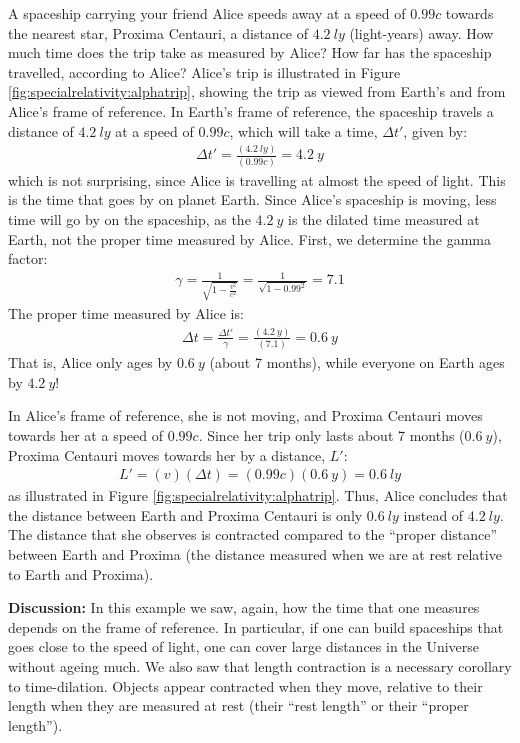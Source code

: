 \vspace{-0.3cm}
\begin{example}{\label{ex:specialrelativity:alphatrip}A spaceship carrying your friend Alice speeds away at a speed of $0.99c$ towards the nearest star, Proxima Centauri, a distance of $\SI{4.2}{ly}$ (light-years) away. How much time does the trip take as measured by Alice? How far has the spaceship travelled, according to Alice?}
Alice's trip is illustrated in Figure \ref{fig:specialrelativity:alphatrip}, showing the trip as viewed from Earth's and from Alice's frame of reference.
In Earth's frame of reference, the spaceship travels a distance of $\SI{4.2}{ly}$ at a speed of $0.99c$, which will take a time, $\Delta t'$, given by:
\begin{align*}
\Delta t' = \frac{(\SI{4.2}{ly})}{(0.99c)}=\SI{4.2}{y}
\end{align*}
which is not surprising, since Alice is travelling at almost the speed of light. This is the time that goes by on planet Earth. Since Alice's spaceship is moving, less time will go by on the spaceship, as the $\SI{4.2}{y}$ is the dilated time measured at Earth, not the proper time measured by Alice. First, we determine the gamma factor:
\begin{align*}
\gamma = \frac{1}{\sqrt{1-\frac{v^2}{c^2}}} =\frac{1}{\sqrt{1-0.99^2}}=7.1
\end{align*}
The proper time measured by Alice is:
\begin{align*}
\Delta t = \frac{\Delta t'}{\gamma}=\frac{(\SI{4.2}{y})}{(7.1)}=\SI{0.6}{y}
\end{align*}
That is, Alice only ages by $\SI{0.6}{y}$ (about 7 months), while everyone on Earth ages by $\SI{4.2}{y}$!

In Alice's frame of reference, she is not moving, and Proxima Centauri moves towards her at a speed of $0.99c$. Since her trip only lasts about 7 months ($\SI{0.6}{y}$), Proxima Centauri moves towards her by a distance, $L'$:
\begin{align*}
L'=(v)(\Delta t)=(0.99c)(\SI{0.6}{y})=\SI{0.6}{ly}
\end{align*}
as illustrated in Figure \ref{fig:specialrelativity:alphatrip}. Thus, Alice concludes that the distance between Earth and Proxima Centauri is only $\SI{0.6}{ly}$ instead of $\SI{4.2}{ly}$. The distance that she observes is contracted compared to the ``proper distance'' between Earth and Proxima (the distance measured when we are at rest relative to Earth and Proxima).

\textbf{Discussion: }In this example we saw, again, how the time that one measures depends on the frame of reference. In particular, if one can build spaceships that goes close to the speed of light, one can cover large distances in the Universe without ageing much. We also saw that length contraction is a necessary corollary to time-dilation. Objects appear contracted when they move, relative to their length when they are measured at rest (their ``rest length'' or their ``proper length'').
\end{example}
